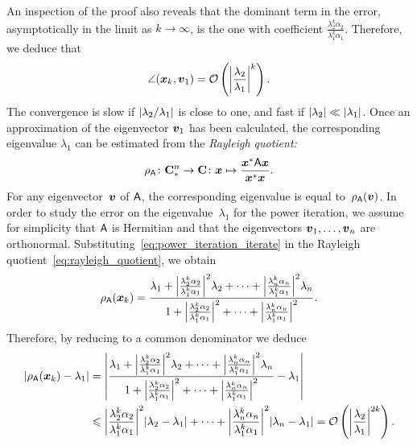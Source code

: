 An inspection of the proof also reveals that the dominant term in the error,
asymptotically in the limit as $k \to \infty$,
is the one with coefficient $\frac{\lambda_2^k \alpha_2}{\lambda_1^k \alpha_1}$.
Therefore, we deduce that
\[
    \angle(\vect x_k, \vect v_1) = \bigo \left( \abs*{\frac{\lambda_2}{\lambda_1}}^k \right).
\]
The convergence is slow if $\abs{\lambda_2/\lambda_1}$ is close to one,
and fast if $\abs{\lambda_2} \ll \abs{\lambda_1}$.
Once an approximation of the eigenvector $\vect v_1$ has been calculated,
the corresponding eigenvalue $\lambda_1$ can be estimated from the \emph{Rayleigh quotient:}
\begin{equation}
    \label{eq:rayleigh_quotient}
    \rho_{\mat A}\colon \mat \complex^n_* \to \complex\colon \vect x \mapsto \frac{\vect x^* \mat A \vect x}{\vect x^* \vect x}.
\end{equation}
For any eigenvector~$\vect v$ of $\mat A$,
the corresponding eigenvalue is equal to~$\rho_{\mat A}(\vect v)$.
In order to study the error on the eigenvalue~$\lambda_1$ for the power iteration,
we assume for simplicity that $\mat A$ is Hermitian
and that the eigenvectors $\vect v_1, \dotsc, \vect v_n$ are orthonormal.
Substituting~\eqref{eq:power_iteration_iterate} in the Rayleigh quotient~\eqref{eq:rayleigh_quotient},
we obtain
\[
    \rho_{\mat A}(\vect x_k)
    = \frac{\lambda_1 + \abs*{ \frac{\lambda_2^k \alpha_2}{\lambda_1^k \alpha_1} }^2 \lambda_2 +  \dotsb + \abs*{ \frac{\lambda_n^k \alpha_n}{\lambda_1^k \alpha_1} }^2 \lambda_n}
    {1 + \abs*{ \frac{\lambda_2^k \alpha_2}{\lambda_1^k \alpha_1} }^2 +  \dotsb +  \abs*{ \frac{\lambda_n^k \alpha_n}{\lambda_1^k \alpha_1} }^2}.
\]
Therefore,
by reducing to a common denominator we deduce
\begin{align*}
    \abs{\rho_{\mat A}(\vect x_k) - \lambda_1}
    &= \left\lvert \frac{\lambda_1 + \abs*{ \frac{\lambda_2^k \alpha_2}{\lambda_1^k \alpha_1} }^2 \lambda_2 +  \dotsb + \abs*{ \frac{\lambda_n^k \alpha_n}{\lambda_1^k \alpha_1} }^2 \lambda_n}
    {1 + \abs*{ \frac{\lambda_2^k \alpha_2}{\lambda_1^k \alpha_1} }^2 +  \dotsb +  \abs*{ \frac{\lambda_n^k \alpha_n}{\lambda_1^k \alpha_1} }^2} - \lambda_1 \right\rvert \\
    &\leq  \abs*{ \frac{\lambda_2^k \alpha_2}{\lambda_1^k \alpha_1} }^2 \abs{\lambda_2 - \lambda_1} +  \dotsb + \abs*{ \frac{\lambda_n^k \alpha_n}{\lambda_1^k \alpha_1} }^2 \abs{\lambda_n- \lambda_1}
    = \bigo\left(\abs*{\frac{\lambda_2}{\lambda_1}}^{2k}\right).
\end{align*}

